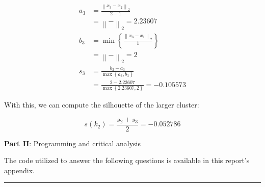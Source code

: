 \documentclass[12pt]{article}
\begin{document}
\begin{enumerate}[leftmargin=\labelsep]
\begin{enumerate}[leftmargin=\labelsep]
\begin{paracol}{2}
                  \begin{equation*}
                    \begin{aligned}
                      a_3 & = \frac{\left\| x_3 - x_2 \right\|_2}{2 - 1}                             \\
                          & = \left\|  -  \right\|_2
                      = 2.23607                                                                      \\
                      b_3 & = \min\left\{\frac{\left\| x_3 - x_1 \right\|_2}{1}\right\}              \\
                          & = \left\|  -  \right\|_2
                      = 2                                                                            \\
                      s_3 & = \frac{b_3 - a_3}{\max\left\{a_3, b_3\right\}}                          \\
                          & = \frac{2 - 2.23607}{\max\left\{2.23607, 2\right\}} = -0.105573
                    \end{aligned}
                  \end{equation*}

                \end{paracol}

                \vspace*{0.5cm}

                With this, we can compute the silhouette of the larger cluster:

                \begin{equation*}
                  s(k_2) = \frac{s_2 + s_3}{2} = -0.052786
                \end{equation*}


        \end{enumerate}

\end{enumerate}

\pagebreak

\center\large{\textbf{Part II}: Programming and critical analysis}

\begin{justify}
  The code utilized to answer the following questions is available in this
  report's appendix.
\end{justify}

\hrule \vspace*{0.5cm}
\end{document}

